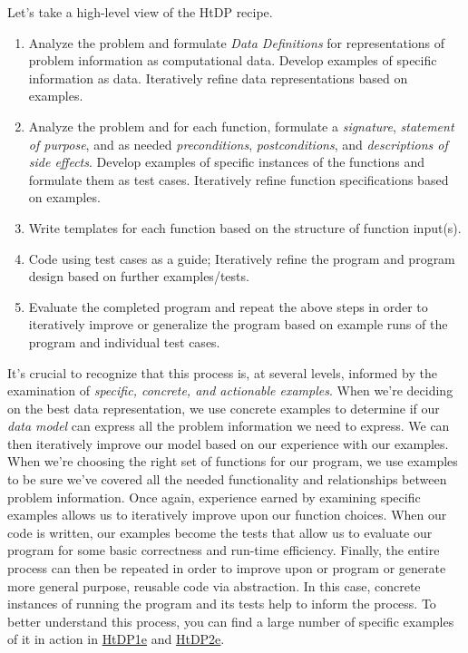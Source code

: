 \documentclass[]{tufte-handout}
\begin{document}
Let's take a high-level view of the HtDP recipe.
\begin{enumerate}
\item Analyze the problem and formulate \textit{Data Definitions} for representations of problem information as computational data.  Develop examples of specific information as data. Iteratively refine data representations based on examples.
\item Analyze the problem and for each function, formulate a \textit{signature}, \textit{statement of purpose}, and as needed \textit{preconditions}, \textit{postconditions}, and \textit{descriptions of side effects}. Develop examples of specific instances of the functions and formulate them as test cases. Iteratively refine function specifications based on examples.
\item Write templates for each function based on the structure of function input(s).
\item Code using test cases as a guide; Iteratively refine the program and program design based on further examples/tests.  
\item Evaluate the completed program and repeat the above steps in order to iteratively improve or generalize the program based on example runs of the program and individual test cases.
\end{enumerate}

It's crucial to recognize that this process is, at several levels, informed by the examination of \textit{specific, concrete, and actionable examples}.  When we're deciding on the best data representation, we use concrete examples to determine if our \textit{data model} can express all the problem information we need to express. We can then iteratively improve our model based on our experience with our examples. When we're choosing the right set of functions for our program, we use examples to be sure we've covered all the needed functionality and relationships between problem information.  Once again, experience earned by examining specific examples allows us to iteratively improve upon our function choices. When our code is written, our examples become the tests that allow us to evaluate our program for some basic correctness and run-time efficiency.   Finally, the entire process can then be repeated in order to improve upon or program or generate more general purpose, reusable code via abstraction.  In this case, concrete instances of running the program and its tests help to inform the process. To better understand this process, you can find a large number of specific examples of it in action in \href{http://htdp.org}{HtDP1e} and \href{http://www.ccs.neu.edu/home/matthias/HtDP2e/}{HtDP2e}.
\end{document}
